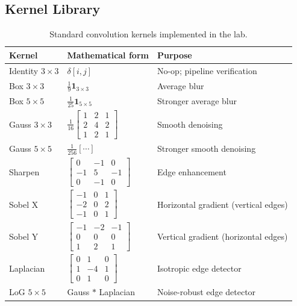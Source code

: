 \documentclass[12pt,a4paper]{article}
\begin{document}
\subsection{Kernel Library}

\begin{table}[H]
  \centering
  \begin{tabular}{@{}lll@{}}
    \toprule
    Kernel & Mathematical form & Purpose \\
    \midrule
    Identity $3\times3$ & $\delta[i,j]$ & No-op; pipeline verification \\[4pt]
    Box $3\times3$ & $\frac{1}{9}\mathbf{1}_{3\times3}$ & Average blur \\[4pt]
    Box $5\times5$ & $\frac{1}{25}\mathbf{1}_{5\times5}$ & Stronger average blur \\[4pt]
    Gauss $3\times3$ & $\frac{1}{16}\begin{bmatrix}1&2&1\\2&4&2\\1&2&1\end{bmatrix}$ & Smooth denoising \\[6pt]
    Gauss $5\times5$ & $\frac{1}{256}[\cdots]$ & Stronger smooth denoising \\[4pt]
    Sharpen & $\begin{bmatrix}0&-1&0\\-1&5&-1\\0&-1&0\end{bmatrix}$ & Edge enhancement \\[6pt]
    Sobel X & $\begin{bmatrix}-1&0&1\\-2&0&2\\-1&0&1\end{bmatrix}$ & Horizontal gradient (vertical edges) \\[6pt]
    Sobel Y & $\begin{bmatrix}-1&-2&-1\\0&0&0\\1&2&1\end{bmatrix}$ & Vertical gradient (horizontal edges) \\[6pt]
    Laplacian & $\begin{bmatrix}0&1&0\\1&-4&1\\0&1&0\end{bmatrix}$ & Isotropic edge detector \\[6pt]
    LoG $5\times5$ & Gauss $\ast$ Laplacian & Noise-robust edge detector \\
    \bottomrule
  \end{tabular}
  \caption{Standard convolution kernels implemented in the lab.}
\end{table}
\end{document}
